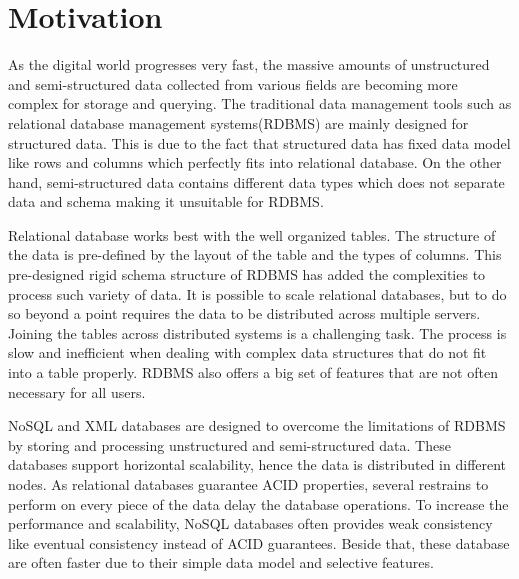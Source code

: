 
\section{Motivation}
		\label{motivation}
		    As the digital world progresses very fast, the massive amounts of unstructured and semi-structured data collected from various fields are becoming more complex for storage and querying. The traditional data management tools such as relational database management systems(RDBMS) are mainly designed for structured data. This is due to the fact that structured data has fixed data model like rows and columns which perfectly fits into relational database. On the other hand, semi-structured data contains different data types which does not separate data and schema making it unsuitable for RDBMS.
\par		
Relational database works best with the well organized tables. The structure of the data is pre-defined by the layout of the table and the types of columns. This pre-designed rigid schema structure of RDBMS has added the complexities to process such variety of data. It is possible to scale relational databases, but to do so beyond a point requires the data to be distributed across multiple servers. Joining the tables across distributed systems is a challenging task. The process is slow and inefficient when dealing with complex data structures that do not fit into a table properly. RDBMS also offers a big set of features that are not often necessary for all users. 
	\par
NoSQL and XML databases are designed to overcome the limitations of RDBMS by storing and processing unstructured and semi-structured data. These databases support horizontal scalability, hence the data is distributed in different nodes. As relational databases guarantee ACID properties, several restrains to perform on every piece of the data delay the database operations. To increase the performance and scalability, NoSQL databases often provides weak consistency like eventual consistency instead of ACID guarantees. Beside that, these database are often faster due to their simple data model and selective features.
